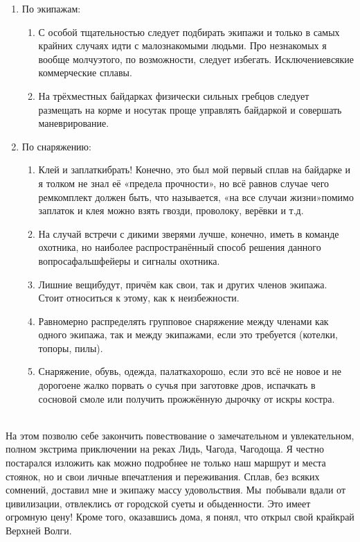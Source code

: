 \begin{enumerate}
	\item По экипажам:
		\begin{enumerate}
		\setlength{\itemindent}{0em}
		\item [$-$] С особой тщательностью следует подбирать экипажи и только в самых крайних случаях идти с малознакомыми людьми. Про незнакомых я вообще молчу\mdash этого, по возможности, следует избегать. Исключение\mdash всякие коммерческие сплавы.
		\item [$-$] На трёхместных байдарках физически сильных гребцов следует размещать на корме и носу\mdash так проще управлять байдаркой и совершать маневрирование. 
	\end{enumerate}
	\item По снаряжению:
	\begin{enumerate}
		\setlength{\itemindent}{0em}
		\item [$-$] Клей и заплатки\mdash брать! Конечно, это был мой первый сплав на байдарке и я толком не знал её «предела прочности», но всё равно\mdash в случае чего ремкомплект должен быть, что называется, «на все случаи жизни»\mdash помимо заплаток и клея можно взять гвозди, проволоку, верёвки и т.д.
		\item [$-$] На случай встречи с дикими зверями лучше, конечно, иметь в команде охотника, но наиболее распространённый способ решения данного вопроса\mdash фальшфейеры и сигналы охотника.
		\item [$-$] Лишние вещи\mdash будут, причём как свои, так и других членов экипажа. Стоит относиться к этому, как к неизбежности.
		\item [$-$] Равномерно распределять групповое снаряжение между членами как одного экипажа, так и между экипажами, если это требуется (котелки, топоры, пилы).
		\item [$-$] Снаряжение, обувь, одежда, палатка\mdash хорошо, если это всё не новое и не дорогое\mdash не жалко порвать о сучья при заготовке дров, испачкать в сосновой смоле или получить прожжённую дырочку от искры костра.
	\end{enumerate}
\end{enumerate}
~\\

На этом позволю себе закончить повествование о замечательном и увлекательном, полном экстрима приключении на реках Лидь, Чагода, Чагодоща. Я честно постарался изложить как можно подробнее не только наш маршрут и места стоянок, но и свои личные впечатления и переживания. Сплав, без всяких сомнений, доставил мне и экипажу массу удовольствия. Мы~побывали вдали от цивилизации, отвлеклись от городской суеты и обыденности. Это имеет огромную цену! Кроме того, оказавшись дома, я понял, что открыл свой край\mdash край Верхней Волги.

